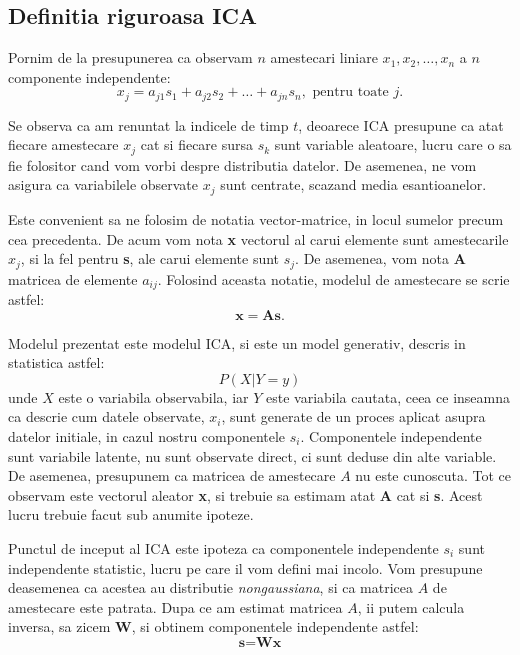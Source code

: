 \documentclass[12pt]{article}
\begin{document}
\subsection{Definitia riguroasa ICA}
Pornim de la presupunerea ca observam $n$ amestecari liniare $x_1, x_2, \ldots, x_n$ a $n$ componente independente:
	\begin{equation}
		x_j=a_{j1}s_1+a_{j2}s_2+\ldots+a_{jn}s_n, \text{ pentru toate }j.
	\end{equation}

Se observa ca am renuntat la indicele de timp $t$, deoarece ICA presupune ca atat fiecare amestecare $x_j$ cat si fiecare sursa $s_k$ sunt variable aleatoare, lucru care o sa fie folositor cand vom vorbi despre distributia datelor. De asemenea, ne vom asigura ca variabilele observate $x_j$ sunt centrate, scazand media esantioanelor.

Este convenient sa ne folosim de notatia vector-matrice, in locul sumelor precum cea precedenta. De acum vom nota \textbf{x} vectorul al carui elemente sunt amestecarile $x_j$, si la fel pentru \textbf{s}, ale carui elemente sunt $s_j$. De asemenea, vom nota \textbf{A} matricea de elemente $a_{ij}$. Folosind aceasta notatie, modelul de amestecare se scrie astfel:
\begin{equation}
	\textbf{x}=\textbf{As}.
\end{equation}

Modelul prezentat este modelul ICA, si este un model generativ, descris in statistica astfel:
\begin{equation}
	P(X|Y=y) 
\end{equation}
unde $X$ este o variabila observabila, iar $Y$ este variabila cautata, ceea ce inseamna ca descrie cum datele observate, $x_i$, sunt generate de un proces aplicat asupra datelor initiale, in cazul nostru componentele $s_i$. Componentele independente sunt variabile latente, nu sunt observate direct, ci sunt deduse din alte variable. De asemenea, presupunem ca matricea de amestecare $A$ nu este cunoscuta. Tot ce observam este vectorul aleator \textbf{x}, si trebuie sa estimam atat \textbf{A} cat si \textbf{s}. Acest lucru trebuie facut sub anumite ipoteze.

Punctul de inceput al ICA este ipoteza ca componentele independente $s_i$ sunt independente statistic, lucru pe care il vom defini mai incolo. Vom presupune deasemenea ca acestea au distributie \textit{nongaussiana}, si ca matricea $A$ de amestecare este patrata. Dupa ce am estimat matricea $A$, ii putem calcula inversa, sa zicem \textbf{W}, si obtinem componentele independente astfel:
\begin{equation}
\textbf{s}=\textbf{Wx}
\end{equation}
\end{document}
